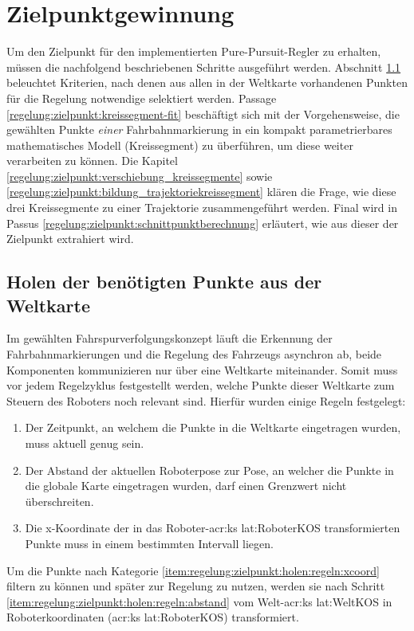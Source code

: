 \section{Zielpunktgewinnung \dcsecondauthorshort}
\label{sec:regelung:zielpunktgewinnung}
Um den Zielpunkt für den implementierten \glqq Pure-Pursuit\grqq -Regler zu erhalten, müssen die nachfolgend beschriebenen Schritte ausgeführt werden. Abschnitt \ref{ssec:regelung:zielpunkt:holen} beleuchtet Kriterien, nach denen aus allen in der Weltkarte vorhandenen Punkten für die Regelung notwendige selektiert werden. Passage \ref{regelung:zielpunkt:kreissegment-fit} beschäftigt sich mit der Vorgehensweise, die gewählten Punkte \emph{einer} Fahrbahnmarkierung in ein kompakt parametrierbares mathematisches Modell (Kreissegment) zu überführen, um diese weiter verarbeiten zu können. Die Kapitel \ref{regelung:zielpunkt:verschiebung_kreissegmente} sowie  \ref{regelung:zielpunkt:bildung_trajektoriekreissegment} klären die Frage, wie diese drei Kreissegmente zu einer Trajektorie zusammengeführt werden. Final wird in Passus \ref{regelung:zielpunkt:schnittpunktberechnung} erläutert, wie aus dieser der Zielpunkt extrahiert wird. 

\subsection{Holen der benötigten Punkte aus der Weltkarte}
\label{ssec:regelung:zielpunkt:holen}
Im gewählten Fahrspurverfolgungskonzept läuft die Erkennung der Fahrbahnmarkierungen und die Regelung des Fahrzeugs asynchron ab, beide Komponenten kommunizieren nur über eine Weltkarte miteinander. Somit muss vor jedem Regelzyklus festgestellt werden, welche Punkte dieser Weltkarte zum Steuern des Roboters noch relevant sind. Hierfür wurden einige Regeln festgelegt:
\begin{enumerate}
\item
Der Zeitpunkt, an welchem die Punkte in die Weltkarte eingetragen wurden, muss aktuell genug sein.
\item \label{item:regelung:zielpunkt:holen:regeln:abstand}
Der Abstand der aktuellen Roboterpose zur Pose, an welcher die Punkte in die globale Karte eingetragen wurden, darf einen Grenzwert nicht überschreiten.
\item \label{item:regelung:zielpunkt:holen:regeln:xcoord}
Die x-Koordinate der in das Roboter-\gls{acr:ks} \gls{lat:RoboterKOS} transformierten Punkte muss in einem bestimmten Intervall liegen.
\end{enumerate}
Um die Punkte nach Kategorie \ref{item:regelung:zielpunkt:holen:regeln:xcoord} filtern zu können und später zur Regelung zu nutzen, werden sie nach Schritt \ref{item:regelung:zielpunkt:holen:regeln:abstand} vom Welt-\gls{acr:ks} \gls{lat:WeltKOS} in Roboterkoordinaten (\gls{acr:ks} \gls{lat:RoboterKOS}) transformiert.

